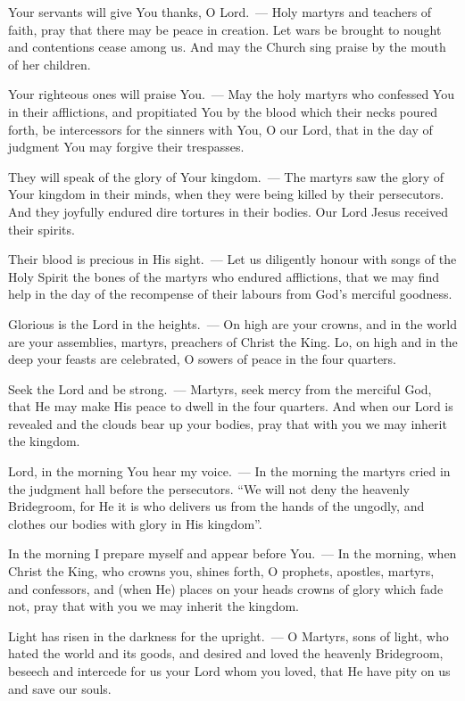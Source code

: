 \documentclass[12pt,twoside,a5paper]{article}
\begin{document}
\begin{halfparskip}
  Your servants will give You thanks, O Lord.~--- Holy martyrs and teachers of faith, pray that there may be peace in creation. Let wars be brought to nought and contentions cease among us. And may the Church sing praise by the mouth of her children.

  Your righteous ones will praise You.~--- May the holy martyrs who confessed You in their afflictions, and propitiated You by the blood which their necks poured forth, be intercessors for the sinners with You, O our Lord, that in the day of judgment You may forgive their trespasses.

  They will speak of the glory of Your kingdom.~--- The martyrs saw the glory of Your kingdom in their minds, when they were being killed by their persecutors. And they joyfully endured dire tortures in their bodies. Our Lord Jesus received their spirits.

  Their blood is precious in His sight.~--- Let us diligently honour with songs of the Holy Spirit the bones of the martyrs who endured afflictions, that we may find help in the day of the recompense of their labours from God's merciful goodness.

  Glorious is the Lord in the heights.~--- On high are your crowns, and in the world are your assemblies, martyrs, preachers of Christ the King. Lo, on high and in the deep your feasts are celebrated, O sowers of peace in the four quarters.

  Seek the Lord and be strong.~--- Martyrs, seek mercy from the merciful God, that He may make His peace to dwell in the four quarters. And when our Lord is revealed and the clouds bear up your bodies, pray that with you we may inherit the kingdom.

  Lord, in the morning You hear my voice.~--- In the morning the martyrs cried in the judgment hall before the persecutors. ``We will not deny the heavenly Bridegroom, for He it is who delivers us from the hands of the ungodly, and clothes our bodies with glory in His kingdom''.

  In the morning I prepare myself and appear before You.~--- In the morning, when Christ the King, who crowns you, shines forth, O prophets, apostles, martyrs, and confessors, and (when He) places on your heads crowns of glory which fade not, pray that with you we may inherit the kingdom.

  Light has risen in the darkness for the upright.~--- O Martyrs, sons of light, who hated the world and its goods, and desired and loved the heavenly Bridegroom, beseech and intercede for us your Lord whom you loved, that He have pity on us and save our souls.


\end{halfparskip}
\end{document}
